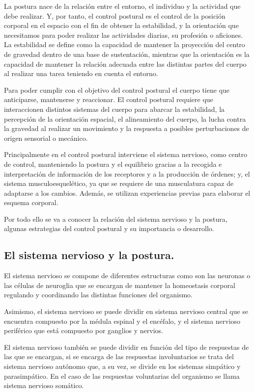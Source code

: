 La postura nace de la relación entre el entorno, el individuo y la actividad que debe realizar. Y, por tanto, el control postural es el control de la posición corporal en el espacio con el fin de obtener la estabilidad, y la orientación que necesitamos para poder realizar las actividades diarias, su profesión o aficiones. La estabilidad se define como la capacidad de mantener la proyección del centro de gravedad dentro de una base de sustentación, mientras que la orientación es la capacidad de mantener la relación adecuada entre las distintas partes del cuerpo al realizar una tarea teniendo en cuenta el entorno.

Para poder cumplir con el objetivo del control postural el cuerpo tiene que anticiparse, mantenerse y reaccionar. El control postural requiere que interaccionen distintos sistemas del cuerpo para abarcar la estabilidad, la percepción de la orientación espacial, el alineamiento del cuerpo, la lucha contra la gravedad al realizar un movimiento y la respuesta a posibles perturbaciones de origen sensorial o mecánico.

Principalmente en el control postural interviene el sistema nervioso, como centro de control, manteniendo la postura y el equilibrio gracias a la recogida e interpretación de información de los receptores y a la producción de órdenes; y, el sistema musculoesquelético, ya que se requiere de una musculatura capaz de adaptarse a los cambios. Además, se utilizan experiencias previas para elaborar el esquema corporal.

Por todo ello se va a conocer la relación del sistema nervioso y la postura, algunas estrategias del control postural y su importancia o desarrollo.

\subsection{El sistema nervioso y la postura.} 
El sistema nervioso se compone de diferentes estructuras como son las neuronas o las células de neuroglia que se encargan de mantener la homeostasis corporal regulando y coordinando las distintas funciones del organismo.

Asimismo, el sistema nervioso se puede dividir en sistema nervioso central que se encuentra compuesto por la médula espinal y el encéfalo, y el sistema nervioso periférico que está compuesto por ganglios y nervios.

El sistema nervioso también se puede dividir en función del tipo de respuestas de las que se encargan, si se encarga de las respuestas involuntarios se trata del sistema nervioso autónomo que, a su vez, se divide en los sistemas simpático y parasimpático. En el caso de las respuestas voluntarias del organismo se llama sistema nervioso somático.

